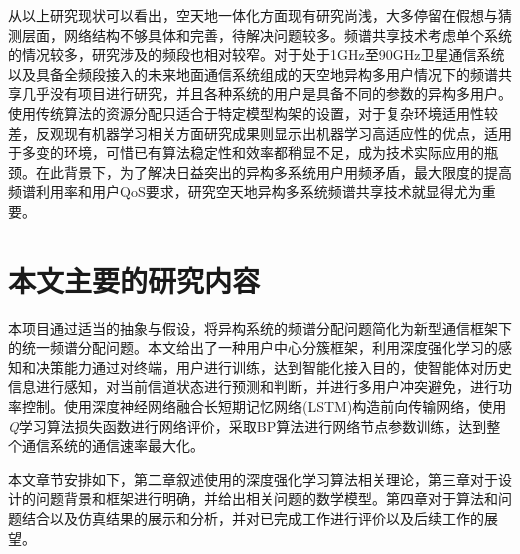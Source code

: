 从以上研究现状可以看出，空天地一体化方面现有研究尚浅，大多停留在假想与猜测层面，网络结构不够具体和完善，待解决问题较多。频谱共享技术考虑单个系统的情况较多，研究涉及的频段也相对较窄。对于处于1GHz至90GHz卫星通信系统以及具备全频段接入的未来地面通信系统组成的天空地异构多用户情况下的频谱共享几乎没有项目进行研究，并且各种系统的用户是具备不同的参数的异构多用户。使用传统算法的资源分配只适合于特定模型构架的设置，对于复杂环境适用性较差，反观现有机器学习相关方面研究成果则显示出机器学习高适应性的优点，适用于多变的环境，可惜已有算法稳定性和效率都稍显不足，成为技术实际应用的瓶颈。在此背景下，为了解决日益突出的异构多系统用户用频矛盾，最大限度的提高频谱利用率和用户QoS要求，研究空天地异构多系统频谱共享技术就显得尤为重要。

\section{本文主要的研究内容}

本项目通过适当的抽象与假设，将异构系统的频谱分配问题简化为新型通信框架下的统一频谱分配问题。本文给出了一种用户中心分簇框架，利用深度强化学习的感知和决策能力通过对终端，用户进行训练，达到智能化接入目的，使智能体对历史信息进行感知，对当前信道状态进行预测和判断，并进行多用户冲突避免，进行功率控制。使用深度神经网络融合长短期记忆网络(LSTM)构造前向传输网络，使用\textit{Q}学习算法损失函数进行网络评价，采取BP算法进行网络节点参数训练，达到整个通信系统的通信速率最大化。

本文章节安排如下，第二章叙述使用的深度强化学习算法相关理论，第三章对于设计的问题背景和框架进行明确，并给出相关问题的数学模型。第四章对于算法和问题结合以及仿真结果的展示和分析，并对已完成工作进行评价以及后续工作的展望。